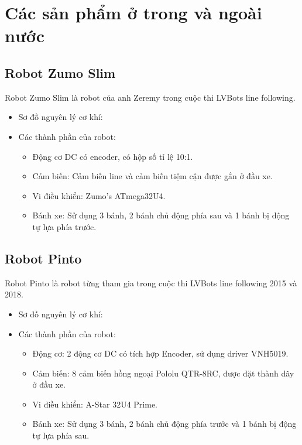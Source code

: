     \section{Các sản phẩm ở trong và ngoài nước}
    \subsection{Robot Zumo Slim}
    \hspace*{0.6cm} Robot Zumo Slim là robot của anh Zeremy trong cuộc thi LVBots line following.
    \begin{itemize}
        \item Sơ đồ nguyên lý cơ khí:
        \item Các thành phần của robot:
            \begin{itemize}[label=\textendash]
                \item Động cơ DC có encoder, có hộp số tỉ lệ 10:1.
                \item Cảm biến: Cảm biến line và cảm biến tiệm cận được gắn ở đầu xe.
                \item Vi điều khiển: Zumo's ATmega32U4.
                \item Bánh xe: Sử dụng 3 bánh, 2 bánh chủ động phía sau và 1 bánh bị động tự lựa phía trước.
            \end{itemize}
    \end{itemize}

    \subsection{Robot Pinto}
    \hspace*{0.6cm} Robot Pinto là robot từng tham gia trong cuộc thi LVBots line following 2015 và 2018.
    \begin{itemize}
        \item Sơ đồ nguyên lý cơ khí:
        \item Các thành phần của robot:
            \begin{itemize}[label=\textendash]
                \item Động cơ: 2 động cơ DC có tích hợp Encoder, sử dụng driver VNH5019.
                \item Cảm biến: 8 cảm biến hồng ngoại Pololu QTR-8RC, được đặt thành dãy ở đầu xe.
                \item Vi điều khiển: A-Star 32U4 Prime.
                \item Bánh xe: Sử dụng 3 bánh, 2 bánh chủ động phía trước và 1 bánh bị động tự lựa phía sau.
            \end{itemize}
    \end{itemize}



